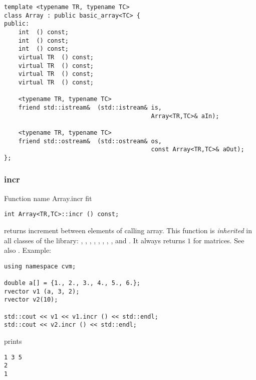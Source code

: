 \bigskip
\noindent%
\verb"template <typename TR, typename TC>"\\
\verb"class Array : public basic_array<TC> {"\\
\verb"public:"\\
\verb"    int "\verb" () const;"\\
\verb"    int "\verb" () const;"\\
\verb"    int "\verb" () const;"\\
\verb"    virtual TR "\verb" () const;"\\
\verb"    virtual TR "\verb" () const;"\\
\verb"    virtual TR "\verb" () const;"\\
\verb"    virtual TR "\verb" () const;"\\
\verb" "\\
\verb"    <typename TR, typename TC>"\\
\verb"    friend std::istream& "\verb" (std::istream& is,"\\
\verb"                                         Array<TR,TC>& aIn);"\\
\verb" "\\
\verb"    <typename TR, typename TC>"\\
\verb"    friend std::ostream& "\verb" (std::ostream& os,"\\
\verb"                                         const Array<TR,TC>& aOut);"\\
\verb"};"
\newpage


\subsubsection{incr}
Function%
\pdfdest name {Array.incr} fit
\begin{Verbatim}
int Array<TR,TC>::incr () const;
\end{Verbatim}
returns  increment between elements of calling array.
This function is \emph{inherited} in all classes of the library:
,   ,
,   ,
, ,
, ,
 and .
It always returns $1$ for matrices.
See also .
Example:
\begin{Verbatim}
using namespace cvm;

double a[] = {1., 2., 3., 4., 5., 6.};
rvector v1 (a, 3, 2);
rvector v2(10);

std::cout << v1 << v1.incr () << std::endl;
std::cout << v2.incr () << std::endl;
\end{Verbatim}
prints
\begin{Verbatim}
1 3 5
2
1
\end{Verbatim}
\newpage


